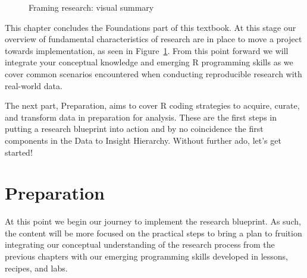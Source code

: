 \documentclass[
  letterpaper,
  DIV=11,
  numbers=noendperiod]{scrreprt}
\theoremstyle{definition}
\theoremstyle{remark}
\begin{document}
\begin{figure}[H]


\caption{\label{fig-fr-visual-summary}Framing research: visual summary}

\end{figure}%

This chapter concludes the Foundations part of this textbook. At this
stage our overview of fundamental characteristics of research are in
place to move a project towards implementation, as seen in
Figure~\ref{fig-fr-visual-summary}. From this point forward we will
integrate your conceptual knowledge and emerging R programming skills as
we cover common scenarios encountered when conducting reproducible
research with real-world data.

The next part, Preparation, aims to cover R coding strategies to
acquire, curate, and transform data in preparation for analysis. These
are the first steps in putting a research blueprint into action and by
no coincidence the first components in the Data to Insight Hierarchy.
Without further ado, let's get started!

\part{Preparation}

At this point we begin our journey to implement the research blueprint.
As such, the content will be more focused on the practical steps to
bring a plan to fruition integrating our conceptual understanding of the
research process from the previous chapters with our emerging
programming skills developed in lessons, recipes, and labs.
\end{document}
